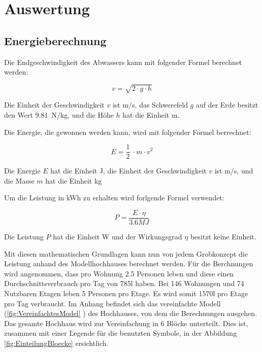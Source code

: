 \section{Auswertung} \label{sec:auswertung}


\subsection{Energieberechnung} \label{subsec:energieberechnung}

Die Endgeschwindigkeit des Abwassers kann mit folgender Formel berechnet werden:
\begin{center}
\[
	v = \sqrt{2 \cdot g \cdot h}
\]
\end{center}

Die Einheit der Geschwindigkeit \(v\) ist \si{m/s}, das Schwerefeld \(g\) auf der Erde besitzt den Wert 9.81~\si{N/kg}, und die Höhe \(h\) hat die Einheit \si{m}.

\bigskip

Die Energie, die gewonnen werden kann, wird mit folgender Formel berrechnet:

\begin{center}
\[
	E =\frac 12\ \cdot m \cdot v^2
\]
\end{center}

Die Energie \(E\) hat die Einheit \si{J}, die Einheit der Geschwindigkeit \(v\) ist \si{m/s}, und die Masse \(m\) hat die Einheit \si{kg}

\bigskip

Um die Leistung in \si{kWh} zu erhalten wird forlgende Formel verwendet:

\begin{center}
\[
	P = \frac{E \cdot \eta}{3.6\si{MJ}}
\]
\end{center}

Die Leistung \(P\) hat die Einheit \si{W} und der Wirkungsgrad \(\eta\) besitzt keine Einheit.

\newpage

Mit diesen mathematischen Grundlagen kann nun von jedem Grobkonzept die Leistung anhand des Modellhochhauses berechnet werden. Für die Berchnungen wird angenommen, dass pro Wohnung 2.5 Personen leben und diese einen Durchschnittsverbrauch pro Tag von 785\si{l} haben. Bei 146 Wohnungen und 74 Nutzbaren Etagen leben 5 Personen pro Etage. Es wird somit 1570\si{l} pro Etage pro Tag verbraucht. Im Anhang befindet sich das vereinfachte Modell (\ref{fig:VereinfachtesModel} ) des Hochhauses, von dem die Berechnungen ausgehen. Das gesamte Hochhaus wird zur Vereinfachung in 6 Blöcke unterteilt. Dies ist, zusammen mit einer Legende für die benutzten Symbole, in der Abbildung \ref{fig:EinteilungBloecke}  ersichtlich.

